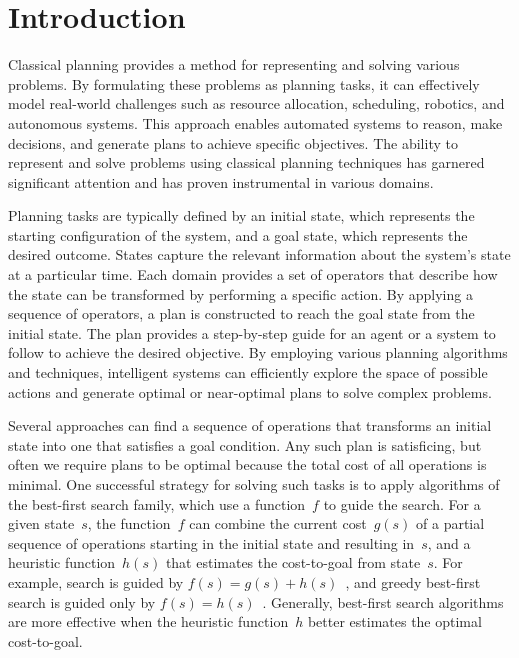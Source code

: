 \chapter{Introduction}
\label{sec:intro}

Classical planning provides a method for representing and solving various problems. By formulating these problems as planning tasks, it can effectively model real-world challenges such as resource allocation, scheduling, robotics, and autonomous systems. This approach enables automated systems to reason, make decisions, and generate plans to achieve specific objectives. The ability to represent and solve problems using classical planning techniques has garnered significant attention and has proven instrumental in various domains.

Planning tasks are typically defined by an initial state, which represents the starting configuration of the system, and a goal state, which represents the desired outcome. States capture the relevant information about the system's state at a particular time. Each domain provides a set of operators that describe how the state can be transformed by performing a specific action. By applying a sequence of operators, a plan is constructed to reach the goal state from the initial state. The plan provides a step-by-step guide for an agent or a system to follow to achieve the desired objective. By employing various planning algorithms and techniques, intelligent systems can efficiently explore the space of possible actions and generate optimal or near-optimal plans to solve complex problems.

Several approaches can find a sequence of operations that transforms an initial state into one that satisfies a goal condition. Any such plan is satisficing, but often we require plans to be optimal because the total cost of all operations is minimal. One successful strategy for solving such tasks is to apply algorithms of the best-first search family, which use a function~$f$ to guide the search. For a given state~$s$, the function~$f$ can combine the current cost~$g(s)$ of a partial sequence of operations starting in the initial state and resulting in~$s$, and a heuristic function~$h(s)$ that estimates the cost-to-goal from state~$s$. For example, \astar search is guided by $f(s)=g(s)+h(s)$~\cite{hart-et-al-ieeessc1968}, and greedy best-first search is guided only by $f(s)=h(s)$~\cite{doran-michie-rsl1966}. Generally, best-first search algorithms are more effective when the heuristic function~$h$ better estimates the optimal cost-to-goal.

